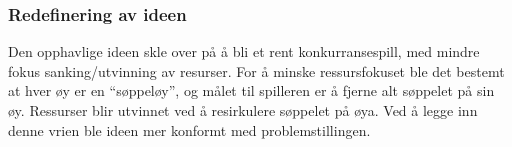 \subsubsection{Redefinering av ideen}
Den opphavlige ideen skle over på å bli et rent konkurransespill, med
mindre fokus sanking/utvinning av resurser. For å minske ressursfokuset
ble det bestemt at hver øy er en ``søppeløy'', og målet til spilleren er
å fjerne alt søppelet på sin øy.  Ressurser blir utvinnet ved å
resirkulere søppelet på øya. Ved å legge inn denne vrien ble ideen mer
konformt med problemstillingen. 

